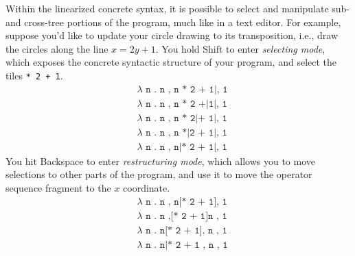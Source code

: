 Within the linearized concrete syntax, it is possible to
select and manipulate sub- and cross-tree portions of the program,
much like in a text editor. For example, suppose you'd like
to update your circle drawing to its transposition,
i.e., draw the circles along the line $x = 2y + 1$.
You hold Shift to enter \emph{selecting mode}, which exposes
the concrete syntactic structure of your program, and select
the tiles \texttt{* 2 + 1}.
\begin{align*}
  & \texttt{$\lambda$ n . n , n * 2 + 1|, 1} \\
  & \texttt{$\lambda$ n . n , n * 2 +|1|, 1} \\
  & \texttt{$\lambda$ n . n , n * 2|+ 1|, 1} \\
  & \texttt{$\lambda$ n . n , n *|2 + 1|, 1} \\
  & \texttt{$\lambda$ n . n , n|* 2 + 1|, 1}
\end{align*}
You hit Backspace to enter \emph{restructuring mode}, which
allows you to move selections to other parts of the program,
and use it to move the operator sequence fragment to the
$x$ coordinate.
\begin{align*}
  & \texttt{$\lambda$ n . n , n[* 2 + 1], 1} \\
  & \texttt{$\lambda$ n . n ,[* 2 + 1]n , 1} \\
  & \texttt{$\lambda$ n . n[* 2 + 1], n , 1} \\
  & \texttt{$\lambda$ n . n|* 2 + 1 , n , 1}
\end{align*}


